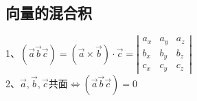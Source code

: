 \documentclass{article}
\begin{document}
\begin{flushleft}
	\subsection{向量的混合积}
	
	1、$(\vec{a}\vec{b}\vec{c})=(\vec{a}\times\vec{b})\cdot\vec{c}=
	\left|\begin{array}{cccc}
	a_x&a_y&a_z\\
	b_x&b_y&b_z\\
	c_x&c_y&c_z
	\end{array}\right|$\\
	2、$\vec{a},\vec{b},\vec{c}$共面$\Leftrightarrow(\vec{a}\vec{b}\vec{c})=0$\\
	
	
	
\end{flushleft}
\end{document}

